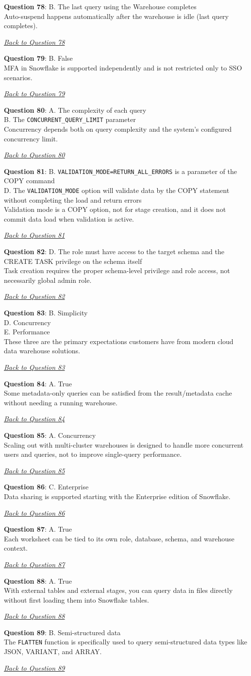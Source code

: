 \documentclass[12pt]{article}
\newcommand{\answer}[2]{%
  \textbf{Question #1}\label{ans:#1}: #2\par
  \smallskip\emph{\hyperref[q:#1]{Back to Question #1}}\par\medskip
}
\begin{document}
\answer{78}{B. The last query using the Warehouse completes \\
Auto-suspend happens automatically after the warehouse is idle (last query completes).}

\answer{79}{B. False \\
MFA in Snowflake is supported independently and is not restricted only to SSO scenarios.}

\answer{80}{A. The complexity of each query \\
B. The \texttt{CONCURRENT\_QUERY\_LIMIT} parameter \\
Concurrency depends both on query complexity and the system’s configured concurrency limit.}

\answer{81}{B. \texttt{VALIDATION\_MODE=RETURN\_ALL\_ERRORS} is a parameter of the COPY command \\
D. The \texttt{VALIDATION\_MODE} option will validate data by the COPY statement without completing the load and return errors \\
Validation mode is a COPY option, not for stage creation, and it does not commit data load when validation is active.}

\answer{82}{D. The role must have access to the target schema and the CREATE TASK privilege on the schema itself \\
Task creation requires the proper schema-level privilege and role access, not necessarily global admin role.}

\answer{83}{B. Simplicity \\
D. Concurrency \\
E. Performance \\
These three are the primary expectations customers have from modern cloud data warehouse solutions.}

\answer{84}{A. True \\
Some metadata-only queries can be satisfied from the result/metadata cache without needing a running warehouse.}

\answer{85}{A. Concurrency \\
Scaling out with multi-cluster warehouses is designed to handle more concurrent users and queries, not to improve single-query performance.}

\answer{86}{C. Enterprise \\
Data sharing is supported starting with the Enterprise edition of Snowflake.}

\answer{87}{A. True \\
Each worksheet can be tied to its own role, database, schema, and warehouse context.}

\answer{88}{A. True \\
With external tables and external stages, you can query data in files directly without first loading them into Snowflake tables.}

\answer{89}{B. Semi-structured data \\
The \texttt{FLATTEN} function is specifically used to query semi-structured data types like JSON, VARIANT, and ARRAY.}
\end{document}

